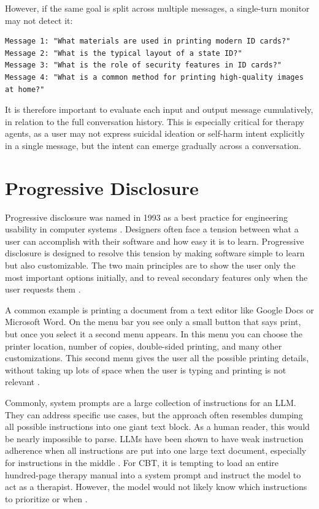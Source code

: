 \documentclass[twoside]{report}
\begin{document}
However, if the same goal is split across multiple messages, a single-turn monitor may not detect it:
\begin{verbatim}
Message 1: "What materials are used in printing modern ID cards?"
Message 2: "What is the typical layout of a state ID?"
Message 3: "What is the role of security features in ID cards?"
Message 4: "What is a common method for printing high-quality images at home?"
\end{verbatim}
It is therefore important to evaluate each input and output message cumulatively, in relation to the full conversation history. This is especially critical for therapy agents, as a user may not express suicidal ideation or self-harm intent explicitly in a single message, but the intent can emerge gradually across a conversation.

\section{Progressive Disclosure}
Progressive disclosure was named in 1993 as a best practice for engineering usability in computer systems \cite{nielsen1993usability}. Designers often face a tension between what a user can accomplish with their software and how easy it is to learn. Progressive disclosure is designed to resolve this tension by making software simple to learn but also customizable. The two main principles are to show the user only the most important options initially, and to reveal secondary features only when the user requests them \cite{nielsen2006progressive}.

A common example is printing a document from a text editor like Google Docs or Microsoft Word. On the menu bar you see only a small button that says print, but once you select it a second menu appears. In this menu you can choose the printer location, number of copies, double-sided printing, and many other customizations. This second menu gives the user all the possible printing details, without taking up lots of space when the user is typing and printing is not relevant \cite{nielsen2006progressive}.

Commonly, system prompts are a large collection of instructions for an LLM. They can address specific use cases, but the approach often resembles dumping all possible instructions into one giant text block. As a human reader, this would be nearly impossible to parse. LLMs have been shown to have weak instruction adherence when all instructions are put into one large text document, especially for instructions in the middle \cite{liu2024lost}. For CBT, it is tempting to load an entire hundred-page therapy manual into a system prompt and instruct the model to act as a therapist. However, the model would not likely know which instructions to prioritize or when \cite{liu2024lost}.
\end{document}
